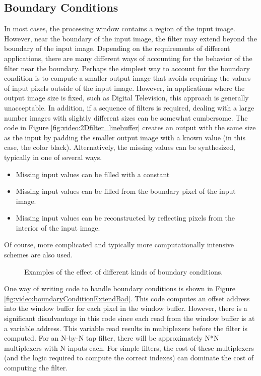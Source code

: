 \subsection{Boundary Conditions}

In most cases, the processing window contains a region of the input image.  However, near the boundary of the input image, the filter may extend beyond the boundary of the input image.  Depending on the requirements of different applications, there are many different ways of accounting for the behavior of the filter near the boundary.  Perhaps the simplest way to account for the boundary condition is to compute a smaller output image that avoids requiring the values of input pixels outside of the input image.  However, in applications where the output image size is fixed, such as Digital Television, this approach is generally unacceptable.  In addition, if a sequence of filters is required, dealing with a large number images with slightly different sizes can be somewhat cumbersome.  The code in Figure \ref{fig:video:2Dfilter_linebuffer} creates an output with the same size as the input by padding the smaller output image with a known value (in this case, the color black).   Alternatively, the missing values can be synthesized, typically in one of several ways.
\begin{itemize}
\item Missing input values can be filled with a constant
\item Missing input values can be filled from the boundary pixel of the input image.
\item Missing input values can be reconstructed by reflecting pixels from the interior of the input image.
\end{itemize}
Of course, more complicated and typically more computationally intensive schemes are also used.

\begin{figure}
\centering

\caption{Examples of the effect of different kinds of boundary conditions.}\label{fig:video:boundary_conditions}
\end{figure}

One way of writing code to handle boundary conditions is shown in Figure \ref{fig:video:boundaryConditionExtendBad}.  This code computes an offset address into the window buffer for each pixel in the window buffer.  However, there is a significant disadvantage in this code since each read from the window buffer is at a variable address.  This variable read results in multiplexers before the filter is computed.  For an N-by-N tap filter, there will be approximately N*N multiplexers with N inputs each.  For simple filters, the cost of these multiplexers (and the logic required to compute the correct indexes) can dominate the cost of computing the filter.

